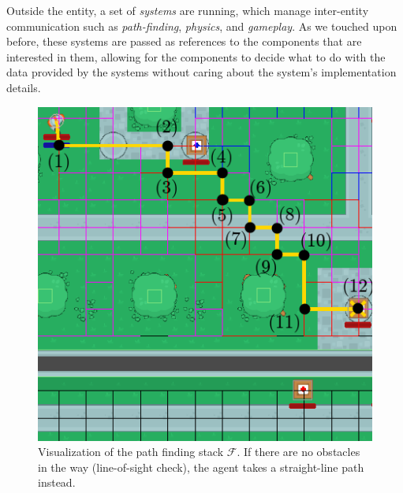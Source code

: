 \documentclass[a4paper, twocolumn]{article}
\begin{document}
        Outside the entity, a set of \emph{systems} are running, which manage inter-entity communication such as \emph{path-finding}, \emph{physics}, and \emph{gameplay}. As we touched upon before, these systems are passed as references to the components that are interested in them, allowing for the components to decide what to do with the data provided by the systems without caring about the system's implementation details.

        \begin{figure}[H]
            \centering
            \includegraphics[width=0.7\linewidth]{share/path_finding_stack.png}
            \caption{Visualization of the path finding stack \(\mathcal{F}\). If there are no obstacles in the way (line-of-sight check), the agent takes a straight-line path instead.}
            \label{fig:path_finding_stack}
        \end{figure}

\end{document}
